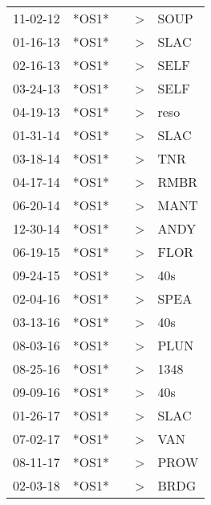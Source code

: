 \begin{supertabular}{p{0.07\textwidth}p{0.06\textwidth}p{0.02\textwidth}p{0.02\textwidth}p{0.06\textwidth}}
 11-02-12\textsuperscript{} &  *OS1* &   &  \textgreater &  SOUP\textsuperscript{} \\
 01-16-13\textsuperscript{} &  *OS1* &   &  \textgreater &  SLAC\textsuperscript{} \\
 02-16-13\textsuperscript{} &  *OS1* &   &  \textgreater &  SELF\textsuperscript{} \\
 03-24-13\textsuperscript{} &  *OS1* &   &  \textgreater &  SELF\textsuperscript{} \\
 04-19-13\textsuperscript{} &  *OS1* &   &  \textgreater &  reso\textsuperscript{} \\
 01-31-14\textsuperscript{} &  *OS1* &   &  \textgreater &  SLAC\textsuperscript{} \\
 03-18-14\textsuperscript{} &  *OS1* &   &  \textgreater &   TNR\textsuperscript{} \\
 04-17-14\textsuperscript{} &  *OS1* &   &  \textgreater &  RMBR\textsuperscript{} \\
 06-20-14\textsuperscript{} &  *OS1* &   &  \textgreater &  MANT\textsuperscript{} \\
 12-30-14\textsuperscript{} &  *OS1* &   &  \textgreater &  ANDY\textsuperscript{} \\
 06-19-15\textsuperscript{} &  *OS1* &   &  \textgreater &  FLOR\textsuperscript{} \\
 09-24-15\textsuperscript{} &  *OS1* &   &  \textgreater &   40s\textsuperscript{} \\
 02-04-16\textsuperscript{} &  *OS1* &   &  \textgreater &  SPEA\textsuperscript{} \\
 03-13-16\textsuperscript{} &  *OS1* &   &  \textgreater &   40s\textsuperscript{} \\
 08-03-16\textsuperscript{} &  *OS1* &   &  \textgreater &  PLUN\textsuperscript{} \\
 08-25-16\textsuperscript{} &  *OS1* &   &  \textgreater &  1348\textsuperscript{} \\
 09-09-16\textsuperscript{} &  *OS1* &   &  \textgreater &   40s\textsuperscript{} \\
 01-26-17\textsuperscript{} &  *OS1* &   &  \textgreater &  SLAC\textsuperscript{} \\
 07-02-17\textsuperscript{} &  *OS1* &   &  \textgreater &   VAN\textsuperscript{} \\
 08-11-17\textsuperscript{} &  *OS1* &   &  \textgreater &  PROW\textsuperscript{} \\
 02-03-18\textsuperscript{} &  *OS1* &   &  \textgreater &  BRDG\textsuperscript{} \\

\end{supertabular}
